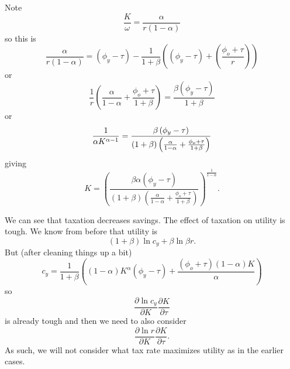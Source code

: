 \documentclass{sebase}
\begin{document}
Note 
\begin{equation*}
\frac{K}{\omega }=\frac{\alpha }{r\left( 1-\alpha \right) }
\end{equation*}%
so this is 
\begin{equation*}
\frac{\alpha }{r\left( 1-\alpha \right) }=\left( \phi _{y}-\tau \right) -%
\frac{1}{1+\beta }\left( \left( \phi _{y}-\tau \right) +\left( \frac{\phi
_{o}+\tau }{r}\right) \right)
\end{equation*}%
or%
\begin{equation*}
\frac{1}{r}\left( \frac{\alpha }{1-\alpha }+\frac{\phi _{o}+\tau }{1+\beta }%
\right) =\frac{\beta \left( \phi _{y}-\tau \right) }{1+\beta }
\end{equation*}%
or%
\begin{equation*}
\frac{1}{\alpha K^{\alpha -1}}=\frac{\beta \left( \phi _{y}-\tau \right) }{%
\left( 1+\beta \right) \left( \frac{\alpha }{1-\alpha }+\frac{\phi _{o}+\tau 
}{1+\beta }\right) }
\end{equation*}%
giving 
\begin{equation*}
K=\left( \frac{\beta \alpha \left( \phi _{y}-\tau \right) }{\left( 1+\beta
\right) \left( \frac{\alpha }{1-\alpha }+\frac{\phi _{o}+\tau }{1+\beta }%
\right) }\right) ^{\frac{1}{1-\alpha }}.
\end{equation*}

\pagebreak

We can see that taxation decreases savings. The effect of taxation on
utility is tough. We know from before that utility is 
\begin{equation*}
\left( 1+\beta \right) \ln c_{y}+\beta \ln \beta r.
\end{equation*}%
But (after cleaning things up a bit)%
\begin{equation*}
c_{y}=\frac{1}{1+\beta }\left( \left( 1-\alpha \right) K^{\alpha }\left(
\phi _{y}-\tau \right) +\frac{\left( \phi _{o}+\tau \right) \left( 1-\alpha
\right) K}{\alpha }\right)
\end{equation*}%
so 
\begin{equation*}
\frac{\partial \ln c_{y}}{\partial K}\frac{\partial K}{\partial \tau }
\end{equation*}%
is already tough and then we need to also consider 
\begin{equation*}
\frac{\partial \ln r}{\partial K}\frac{\partial K}{\partial \tau }.
\end{equation*}%
As such, we will not consider what tax rate maximizes utility as in the
earlier cases.
\end{document}

